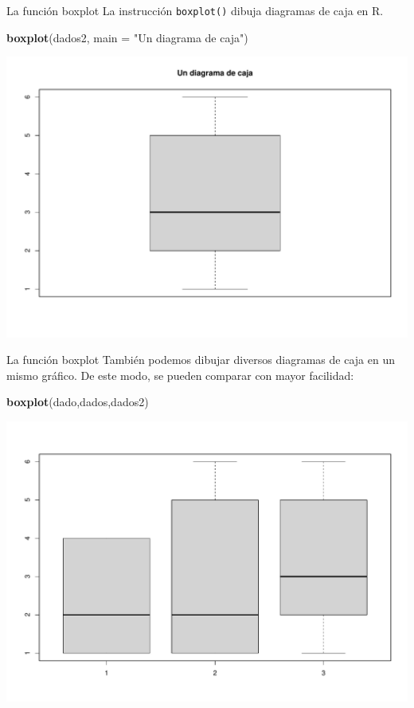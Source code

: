 \documentclass[
  ignorenonframetext,
]{beamer}
\newenvironment{Shaded}{\begin{snugshade}}{\end{snugshade}}
\newcommand{\AttributeTok}[1]{\textcolor[rgb]{0.13,0.29,0.53}{#1}}
\newcommand{\FunctionTok}[1]{\textcolor[rgb]{0.13,0.29,0.53}{\textbf{#1}}}
\newcommand{\NormalTok}[1]{#1}
\newcommand{\StringTok}[1]{\textcolor[rgb]{0.31,0.60,0.02}{#1}}
\begin{document}
\begin{frame}[fragile]{La función boxplot}
\label{la-funciuxf3n-boxplot}
La instrucción \texttt{boxplot()} dibuja diagramas de caja en R.

\begin{Shaded}
\begin{Highlighting}[]
\FunctionTok{boxplot}\NormalTok{(dados2, }\AttributeTok{main =} \StringTok{"Un diagrama de caja"}\NormalTok{)}
\end{Highlighting}
\end{Shaded}

\includegraphics[width=0.8\linewidth]{R_base_files/figure-beamer/unnamed-chunk-186-1}
\end{frame}

\begin{frame}[fragile]{La función boxplot}
\label{la-funciuxf3n-boxplot-1}
También podemos dibujar diversos diagramas de caja en un mismo gráfico.
De este modo, se pueden comparar con mayor facilidad:

\begin{Shaded}
\begin{Highlighting}[]
\FunctionTok{boxplot}\NormalTok{(dado,dados,dados2)}
\end{Highlighting}
\end{Shaded}

\includegraphics[width=0.8\linewidth]{R_base_files/figure-beamer/unnamed-chunk-187-1}
\end{frame}
\end{document}
